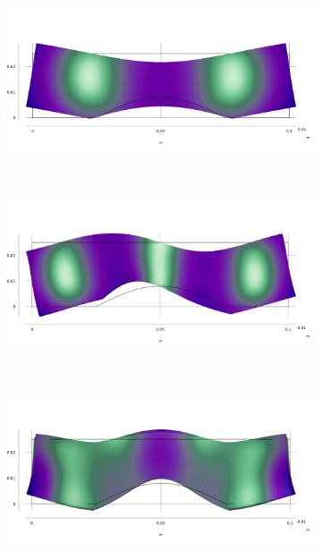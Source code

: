 \documentclass[a4paper]{article}
\begin{document}
\begin{figure}[h]
	\centering
	\begin{subfigure}{0.3\linewidth}
		\centering
		\includegraphics[width=0.95\linewidth]{01b.png}
	\end{subfigure}
	~
	\begin{subfigure}{0.3\linewidth}
		\centering
		\includegraphics[width=0.95\linewidth]{02b.png}
	\end{subfigure}
	~
	\begin{subfigure}{0.3\linewidth}
		\centering
		\includegraphics[width=0.95\linewidth]{03b.png}
	\end{subfigure}
	

\end{figure}
\end{document}

